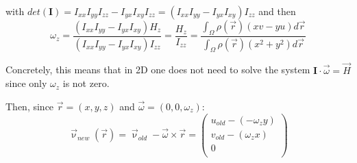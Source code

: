 with $det(\bm I)=I_{xx}I_{yy}I_{zz}-I_{yx}I_{xy}I_{zz}=(I_{xx}I_{yy}-I_{yx}I_{xy})I_{zz}$ and then
\[
\omega_z
=\frac{ ( I_{xx}I_{yy} - I_{yx}I_{xy} ) H_z}{(I_{xx}I_{yy}-I_{yx}I_{xy})I_{zz}}
=\frac{ H_z}{I_{zz}}
=\frac{ \int_\Omega \rho(\vec r) (xv-yu) d\vec r }{ \int_\Omega \rho(\vec r) (x^2+y^2) d\vec r  }
\]

Concretely, this means that in 2D one does not need to solve the system ${\bm I}\cdot \vec \omega = \vec H$
since only $\omega_z$ is not zero.

Then, since $\vec{r}=(x,y,z)$ and $\vec{\omega}=(0,0,\omega_z)$: 
\begin{equation}
\vec \upnu_{new}(\vec{r}) = \vec \upnu_{old} - \vec \omega \times \vec r 
=\left(
\begin{array}{c}
u_{old} - (-\omega_z y) \\
v_{old} - (\omega_z x)\\
0 \\
\end{array}
\right)
\end{equation}















